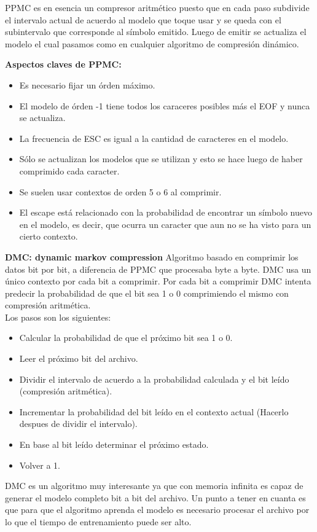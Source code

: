 \documentclass[titlepage,a4paper]{article}
\begin{document}
PPMC es en esencia un compresor aritmético puesto que en cada paso subdivide el intervalo actual de acuerdo al modelo que toque usar y se queda con el subintervalo que corresponde al símbolo emitido.  Luego de emitir se actualiza el modelo el cual pasamos como en cualquier algoritmo de compresión dinámico. 

\textbf{Aspectos claves de PPMC:}
\begin{itemize}
\item Es necesario fijar un órden máximo. 
\item El modelo de órden -1 tiene todos los caraceres posibles más el EOF y nunca se actualiza. 
\item La frecuencia de ESC es igual a la cantidad de caracteres en el modelo. 
\item Sólo se actualizan los modelos que se utilizan y esto se hace luego de haber comprimido cada caracter. 
\item Se suelen usar contextos de orden 5 o 6 al comprimir. 
\item El escape está relacionado con la probabilidad de encontrar un símbolo nuevo en el modelo, es decir, que ocurra un caracter que aun no se ha visto para un cierto contexto. 
\end{itemize}

\textbf{DMC: dynamic markov compression}
Algoritmo basado en comprimir los datos bit por bit, a diferencia de PPMC que procesaba byte a byte. DMC usa un único contexto por cada bit a  comprimir. Por cada bit a comprimir DMC intenta predecir la probabilidad de que el bit sea 1 o 0 comprimiendo el mismo con compresión aritmética. \\
Los pasos son los siguientes: \\
\begin{itemize}
\item Calcular la probabilidad de que el próximo bit sea 1 o 0. 
\item Leer el próximo bit del archivo. 
\item Dividir el intervalo de acuerdo a la probabilidad calculada y el bit leído (compresión aritmética). 
\item Incrementar la probabilidad del bit leído en el contexto actual (Hacerlo despues de dividir el intervalo). 
\item En base al bit leído determinar el próximo estado. 
\item Volver a 1. 
\end{itemize}

DMC es un algoritmo muy interesante ya que con memoria infinita es capaz de generar el modelo completo bit a bit del archivo. Un punto a tener en cuanta es que para que el algoritmo aprenda el modelo es necesario procesar el archivo por lo que el tiempo de entrenamiento puede ser alto. \\
\end{document}
